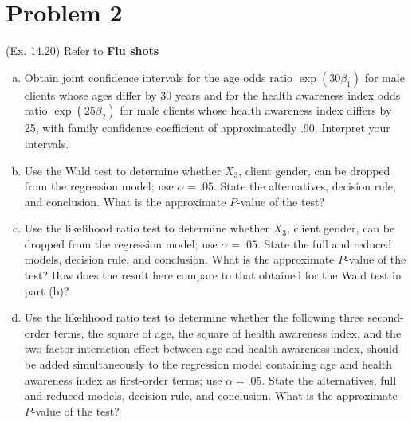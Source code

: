 \documentclass[10pt]{report}
\begin{document}
\section*{Problem 2}
(Ex. 14.20) Refer to \textbf{Flu shots}
\begin{enumerate}[a.]
	\item 
	Obtain joint confidence intervals for the age odds ratio $\exp(30\beta_1)$ for male clients whose ages differ by 30 years and for the health awareness index odds ratio $\exp(25\beta_2)$ for male clients whose health awareness index differs by 25, with family confidence coefficient of approximatedly .90. Interpret your intervals.
	
	\item 
	Use the Wald test to determine whether $X_3$, client gender, can be dropped from the regression model; use $\alpha=.05$. State the alternatives, decision rule, and conclusion. What is the approximate $P$-value of the test?
	
	\item 
	Use the likelihood ratio test to determine whether $X_3$, client gender, can be dropped from the regression model; use $\alpha=.05$. State the full and reduced models, decision rule, and conclusion. What is the approximate $P$-value of the test? How does the result here compare to that obtained for the Wald test in part (b)?
	
	\item 
	Use the likelihood ratio test to determine whether the following three second-order terms, the square of age, the square of health awareness index, and the two-factor interaction effect between age and health awareness index, should be added simultaneously to the regression model containing age and health awareness index as first-order terms; use $\alpha=.05$. State the alternatives, full and reduced models, decision rule, and conclusion. What is the approximate $P$-value of the test?
\end{enumerate}
\end{document}
